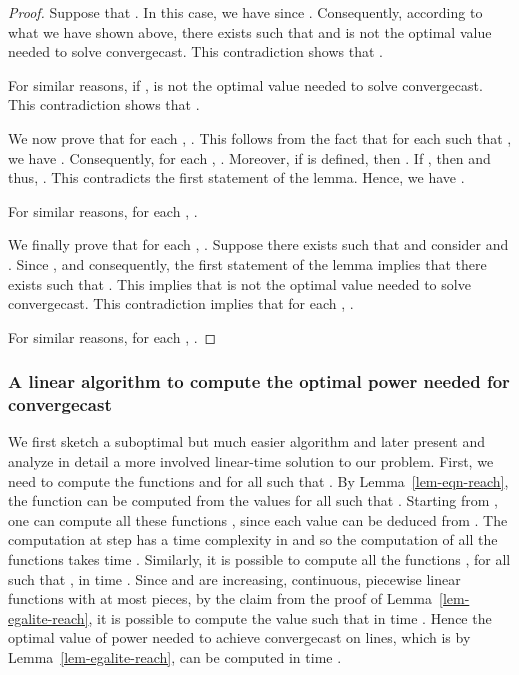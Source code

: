 \documentclass{article}
\newcommand\convergecast{convergecast\xspace}
\begin{document}
\begin{proof}
Suppose that . In this case, we have
 since . Consequently, according to  what we have shown above, there
exists  such that  and
 is not the optimal value needed to solve {\convergecast}.
This contradiction shows that .


For similar reasons, if ,  is not the
optimal value needed to solve {\convergecast}. This contradiction shows that
.

\medskip
We now prove that for each , . This
follows from the fact that for each  such that , we
have . Consequently, for each , . Moreover, if 
is defined, then . If ,
then  and thus, . This contradicts the
first statement of the lemma. Hence, we have .

For similar reasons, for each , . 

\medskip
We finally prove that for each , . Suppose
there exists  such that  and consider 
and . Since ,
 and consequently,
the first statement of the lemma implies that  there exists  such that . This
implies that  is not the optimal value needed to solve convergecast. 
This contradiction implies that for each , .

For similar reasons, for each , . 
\end{proof}



\subsubsection{A linear algorithm to compute the optimal power needed for
  {\convergecast}}  

We first sketch a suboptimal but much easier algorithm and later present and analyze in detail
a more involved linear-time solution to our problem.
First, we need to compute the functions  and  for all  such that . By Lemma~\ref{lem-eqn-reach}, the function  can be computed from the values  for all  such that . Starting from , one can compute all these functions , since each value  can be deduced from 
. The computation at step  has a time complexity in  and so the computation of all the functions  takes time . Similarly, it is possible to compute all the functions , for all  such that , in time .  Since  and  are increasing, continuous, piecewise linear functions with at most  pieces, by the claim from the proof of Lemma~\ref{lem-egalite-reach}, it is possible to compute the value  such that  in time . Hence the optimal value of power needed to achieve {\convergecast} on lines, which is  by Lemma~\ref{lem-egalite-reach}, can be computed in time . 
\end{document}
